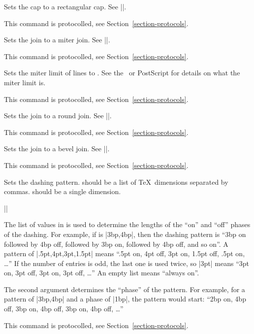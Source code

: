 \begin{command}{\pgfsys@rectcap}
    Sets the cap to a rectangular cap. See |\pgfsys@stroke|.

    This command is protocolled, see Section~\ref{section-protocols}.
\end{command}

\begin{command}{\pgfsys@miterjoin}
    Sets the join to a miter join. See |\pgfsys@stroke|.

    This command is protocolled, see Section~\ref{section-protocols}.
\end{command}

\begin{command}{\pgfsys@setmiterlimit{}}
    Sets the miter limit of lines to . See the \pdf\ or PostScript
    for details on what the miter limit is.

    This command is protocolled, see Section~\ref{section-protocols}.
\end{command}

\begin{command}{\pgfsys@roundjoin}
    Sets the join to a round join. See |\pgfsys@stroke|.

    This command is protocolled, see Section~\ref{section-protocols}.
\end{command}

\begin{command}{\pgfsys@beveljoin}
    Sets the join to a bevel join. See |\pgfsys@stroke|.

    This command is protocolled, see Section~\ref{section-protocols}.
\end{command}

\begin{command}{\pgfsys@setdash{}}
    Sets the dashing pattern.  should be a list of \TeX\
    dimensions separated by commas.  should be a single dimension.

    \example |\pgfsys@setdash{3pt,3pt}{0pt}|

    The list of values in  is used to determine the lengths of
    the ``on'' and ``off'' phases of the dashing. For example, if
    \meta{pattern} is |3bp,4bp|, then the dashing pattern is ``3bp on followed
    by 4bp off, followed by 3bp on, followed by 4bp off, and so on''. A pattern
    of |.5pt,4pt,3pt,1.5pt| means ``.5pt on, 4pt off, 3pt on, 1.5pt off, .5pt
    on, \dots'' If the number of entries is odd, the last one is used twice, so
    |3pt| means ``3pt on, 3pt off, 3pt on, 3pt off, \dots'' An empty list means
    ``always on''.

    The second argument determines the ``phase'' of the pattern. For example,
    for a pattern of |3bp,4bp| and a phase of |1bp|, the pattern would start:
    ``2bp on, 4bp off, 3bp on, 4bp off, 3bp on, 4bp off, \dots''

    This command is protocolled, see Section~\ref{section-protocols}.
\end{command}

